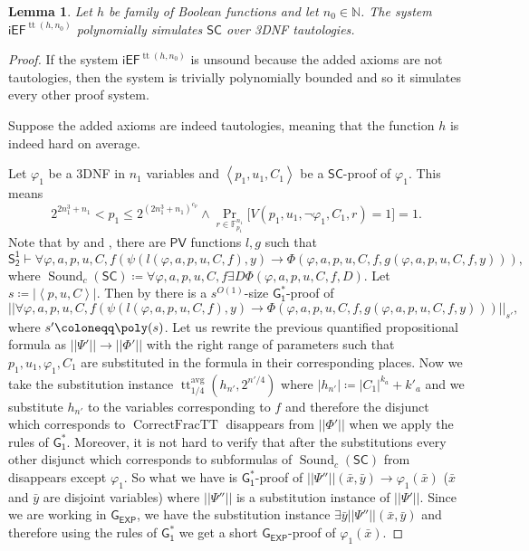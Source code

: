 \documentclass[11pt]{article}
\newcommand{\SOT}{\mathsf{S^1_2}}
\renewcommand{\PV}{\mathsf{PV}}
\newcommand{\GOS}{\mathsf{G^*_1}}
\newcommand{\iEF}{\mathsf{iEF}}
\renewcommand{\SC}{\mathsf{SC}}
\newcommand{\sound}{\operatorname{Sound}}
\DeclareMathOperator*{\foo}{Pr}
\def\<{\left<}
\def\>{\right>}
\def\tt{\operatorname{CorrectFracTT}}
\def\GE{\mathsf{G_{EXP}}}
\def\LB{\ttable}
\theoremstyle{definition}
\theoremstyle{plain}
\newtheorem{lemma}[definition]{Lemma}
\theoremstyle{remark}
\DeclareMathOperator*{\ttt}{tt}
\newcommand{\ttable}{\ttt^{\operatorname{avg}}}
\newcommand{\bbN}{\mathbb{N}}
\newcommand{\bF}{\mathbb{F}}
\begin{document}
\begin{lemma}\label{sim}
    Let $h$ be family of Boolean functions and let $n_0 \in \bbN$. The system $\iEF^{\operatorname{tt}(h, n_0)}$ polynomially simulates $\SC$ over 3DNF tautologies.
\end{lemma}
\begin{proof}
If the system $\iEF^{\operatorname{tt}(h, n_0)}$ is unsound because the added axioms are not tautologies, then the system is trivially polynomially bounded and so it simulates every other proof system.

Suppose the added axioms are indeed tautologies, meaning that the function $h$ is indeed hard on average.

      Let $\varphi_1$ be a 3DNF in $n_1$ variables and $\<p_1,u_1,C_1\>$ be a $\SC$-proof of $\varphi_1$. This means 
    $$2^{2n_1^3+n_1}<p_1\leq 2^{{(2n_1^3+n_1)}^{c_p}} \land \foo_{r\in\bF_{p_1}^{n_1}}\big[V(p_1,u_1,\neg\varphi_1,C_1,r)=1\big]=1.$$   
Note that by  and , there are $\PV$ functions $l,g$ such that 
$$\SOT\vdash\forall \varphi,a,p,u,C,f\left(\psi(l(\varphi,a,p,u,C,f),y)\to\Phi(\varphi,a,p,u,C,f,g(\varphi,a,p,u,C,f,y))\right),$$ where $\sound_c(\SC)\coloneqq\forall \varphi,a,p,u,C,f\exists D\Phi(\varphi,a,p,u,C,f,D)$. Let $s\coloneqq|\<p,u,C\>|$. Then by  there is a $s^{O(1)}$-size $\GOS$-proof of 
    $$||\forall \varphi,a,p,u,C,f\left(\psi(l(\varphi,a,p,u,C,f),y)\to\Phi(\varphi,a,p,u,C,f,g(\varphi,a,p,u,C,f,y))\right)||_{s'},$$ where $s'\coloneqq\poly(s)$. Let us rewrite the previous quantified propositional formula as $||\Psi'||\to||\Phi'||$ with the right range of parameters such that $p_1,u_1,\varphi_1,C_1$ are substituted in the formula in their corresponding places. Now we take the substitution instance $\LB_{1/4}(h_{n'},2^{n'/4})$ %
    where $|h_{n'}|\coloneqq|C_1|^{k_a}+k'_a$ and we substitute $h_{n'}$ to the variables corresponding to $f$ and therefore the disjunct which corresponds to $\tt$ disappears from $||\Phi'||$ when we %
    apply the rules of $\GOS$. Moreover, it is not hard to verify that after the substitutions  every other disjunct which corresponds to subformulas of $\sound_c(\SC)$ from   disappears except $\varphi_1$. So what we have is $\GOS$-proof of $||\Psi''||(\bar{x},\bar{y})\to\varphi_1(\bar{x})$ ($\bar{x}$ and $\bar{y}$ are disjoint variables) where $||\Psi''||$ is a substitution instance of $||\Psi'||$. %
    Since we are working in $\GE$, we have the substitution instance $\exists\bar{y}||\Psi''||(\bar{x},\bar{y})$ and therefore using the rules of $\GOS$ we get a short $\GE$-proof of $\varphi_1(\bar{x})$.
\end{proof}
\end{document}
